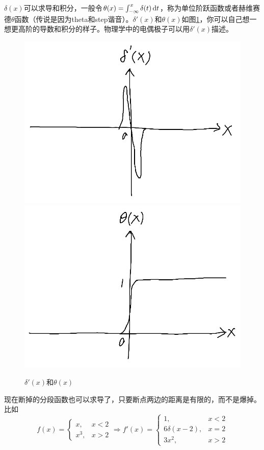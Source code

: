 $\delta(x)$可以求导和积分，一般令$\theta(x)=\int_{-\infty}^x \delta(t) \mathop{}\!\mathrm{d} t$，称为单位阶跃函数或者赫维赛德$\theta$函数（传说是因为theta和step谐音）。$\delta'(x)$和$\theta(x)$如图\ref{fig-delta-d-x}，你可以自己想一想更高阶的导数和积分的样子。物理学中的电偶极子可以用$\delta'(x)$描述。
\begin{figure}[htb]
\centering
\includegraphics[scale=0.5]{fig/delta-d-x}
\includegraphics[scale=0.5]{fig/theta-x}
\caption{$\delta'(x)$和$\theta(x)$}
\label{fig-delta-d-x}
\end{figure}

现在断掉的分段函数也可以求导了，只要断点两边的距离是有限的，而不是爆掉。比如
\begin{equation*}
f(x)=\begin{cases}
x, &x<2 \\
x^3, &x>2
\end{cases} \Rightarrow f'(x)=\begin{cases}
1, &x<2 \\
6 \delta(x-2), &x=2 \\
3x^2, &x>2
\end{cases}
\end{equation*}

